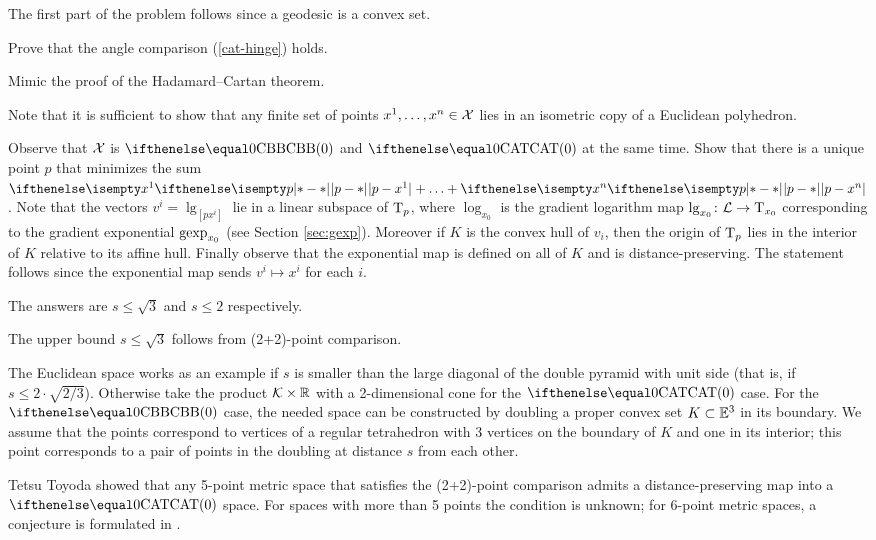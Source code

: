 The first part of the problem follows since a geodesic is a convex set.

Prove that the angle comparison (\ref{cat-hinge}) holds.

Mimic the proof of the Hadamard--Cartan theorem.

Note that it is sufficient to show that any finite set of points $x^1,\dots,x^n\in\spc{X}$ lies in an isometric copy of a Euclidean polyhedron.

Observe that $\mathcal{X}$ is $\Alex0$ and $\CAT0$ at the same time.
Show that there is a unique point $p$ that minimizes the sum $\dist{p}{x^1}{}+\dots+\dist{p}{x^n}{}$.
Note that the vectors $v^i=\lg_{[{p}{x^i}]}$ lie in a linear subspace of $\text{\rm T}_p$, where $\log_{x_0}$  is the gradient logarithm map $\log_{x_0}\:\spc{L}\to\T_{x_0}$ corresponding to the gradient exponential $\mathop{\rm gexp}\nolimits_{x_0}$ (see Section \ref{sec:gexp}).
Moreover if $K$ is the convex hull of $v_i$, then the origin of $\text{\rm T}_p$ lies in the interior of $K$ relative to its affine hull.
Finally observe that the exponential map is defined on all of $K$ and is distance-preserving.
The statement follows since the exponential map sends $v^i\mapsto x^i$ for each $i$.

The answers are $s\le \sqrt3$ and $s\le 2$ respectively.

The upper bound $s\le \sqrt3$ follows from (2+2)-point comparison.

The Euclidean space works as an example if $s$ is smaller than the large diagonal of the double pyramid with unit side (that is, if $s\le 2\cdot\sqrt{2/3}$).
Otherwise take the product $\spc{K}\times \RR$ with a 2-dimensional cone for the $\CAT0$ case.
For the $\Alex0$ case, the needed space can be constructed by doubling  a proper convex set $K\subset\EE^3$ in its boundary.
We assume that the points correspond to vertices of a regular tetrahedron with 3 vertices on the boundary of $K$ and one  in its interior; this point corresponds to a pair of points in the doubling at distance $s$ from each other.

Tetsu Toyoda \cite{toyoda} showed that any 5-point metric space that satisfies the (2+2)-point comparison admits a distance-preserving map into a $\CAT0$ space.
For spaces with more than 5 points the condition is unknown;
for 6-point metric spaces, a conjecture is formulated in \cite{lebedeva-petrunin-zolotov}.

